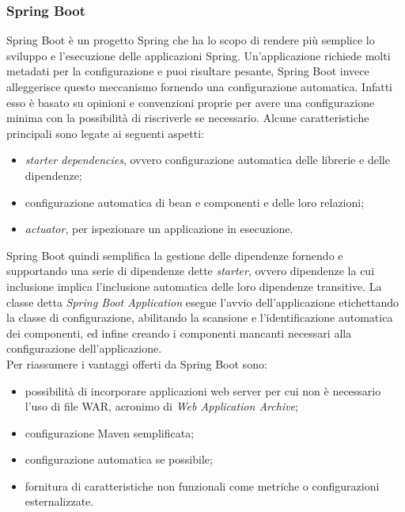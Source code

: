 \subsubsection{Spring Boot}

Spring Boot è un progetto Spring che ha lo scopo di rendere più semplice lo sviluppo e l'esecuzione delle applicazioni Spring. Un'applicazione richiede molti metadati per la configurazione e puoi risultare pesante, Spring Boot invece alleggerisce questo meccanismo fornendo una configurazione automatica. Infatti esso è basato su opinioni e convenzioni proprie per avere una configurazione minima con la possibilità di riscriverle se necessario. Alcune caratteristiche principali sono legate ai seguenti aspetti:
\begin{itemize}
	\item \textit{starter dependencies}, ovvero configurazione automatica delle librerie e delle dipendenze;
	\item configurazione automatica di bean e componenti e delle loro relazioni;
	\item \textit{actuator}, per ispezionare un applicazione in esecuzione.
\end{itemize} 
Spring Boot quindi semplifica la gestione delle dipendenze fornendo e supportando una serie di dipendenze dette \textit{starter}, ovvero dipendenze la cui inclusione implica l'inclusione automatica delle loro dipendenze transitive. La classe detta \textit{Spring Boot Application} esegue l'avvio dell'applicazione etichettando la classe di configurazione, abilitando la scansione e l'identificazione automatica dei componenti, ed infine creando i componenti mancanti necessari alla configurazione dell'applicazione.\\
Per riassumere i vantaggi offerti da Spring Boot sono:
\begin{itemize}
	\item possibilità di incorporare applicazioni web server per cui non è necessario l'uso di file WAR, acronimo di \textit{Web Application Archive};
	\item configurazione Maven semplificata;
	\item configurazione automatica se possibile;
	\item fornitura di caratteristiche non funzionali come metriche o configurazioni esternalizzate.
\end{itemize}

